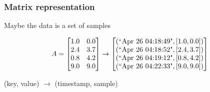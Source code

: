 \documentclass{beamer}
\begin{document}
\begin{frame}
\frametitle{Matrix representation}
Maybe the data is a set of samples

\vspace{0.2in}

\[
A = \begin{bmatrix} 1.0 & 0.0 \\ 2.4 & 3.7 \\ 0.8 & 4.2 \\ 9.0 & 9.0 \end{bmatrix} \rightarrow \begin{bmatrix}  (\text{``Apr 26 04:18:49"}, [1.0, 0.0]) \\  (\text{``Apr 26 04:18:52"}, [2.4, 3.7]) \\ (\text{``Apr 26 04:19:12"}, [0.8, 4.2]) \\ (\text{``Apr 26 04:22:33"}, [9.0, 9.0])  \end{bmatrix}
\]

\vspace{0.3in}
(key, value) $\rightarrow$ (timestamp, sample)

\end{frame}
\end{document}
